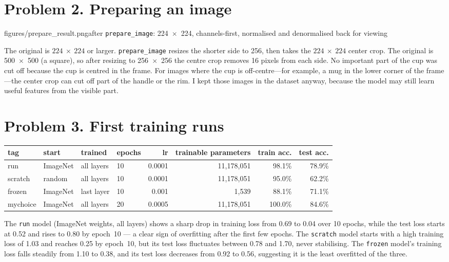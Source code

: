 \documentclass[11pt]{article}
\begin{document}
\section*{Problem 2. Preparing an image}

           {figures/prepare_result.png}{after \texttt{prepare\_image}: 224~$\times$~224, channels-first, normalised and denormalised back for viewing}

The original is $224~\times~224$ or larger.  \texttt{prepare\_image} resizes the
shorter side to 256, then takes the $224~\times~224$ center crop.  The original is 500~$\times$~500 (a square), so after resizing to 256~$\times$~256 the centre crop removes 16 pixels from each side.  No
important part of the cup was cut off because the cup is centred in the frame.
For images where the cup is off-centre---for example, a mug in the lower
corner of the frame---the center crop can cut off part of the handle or the
rim.  I kept those images in the dataset anyway, because the model may still
learn useful features from the visible part.

\section*{Problem 3. First training runs}

\begin{center}\footnotesize
\begin{tabular}{llllrrrr}
\toprule
tag & start & trained & epochs & lr & trainable parameters & train acc. & test acc. \\
\midrule
run & ImageNet & all layers & 10 & 0.0001 & 11,178,051 & 98.1\% & 78.9\% \\
scratch & random & all layers & 10 & 0.0001 & 11,178,051 & 95.0\% & 62.2\% \\
frozen & ImageNet & last layer & 10 & 0.001 & 1,539 & 88.1\% & 71.1\% \\
mychoice & ImageNet & all layers & 20 & 0.0005 & 11,178,051 & 100.0\% & 84.6\% \\
\bottomrule
\end{tabular}
\end{center}


The \texttt{run} model (ImageNet weights, all layers) shows a sharp drop in training loss from 0.69 to 0.04 over 10 epochs, while the test loss starts at 0.52 and rises to 0.80 by epoch~10 --- a clear sign of overfitting after the first few epochs. The \texttt{scratch} model starts with a high training loss of 1.03 and reaches 0.25 by epoch~10, but its test loss fluctuates between 0.78 and 1.70, never stabilising. The \texttt{frozen} model's training loss falls steadily from 1.10 to 0.38, and its test loss decreases from 0.92 to 0.56, suggesting it is the least overfitted of the three.
\end{document}
